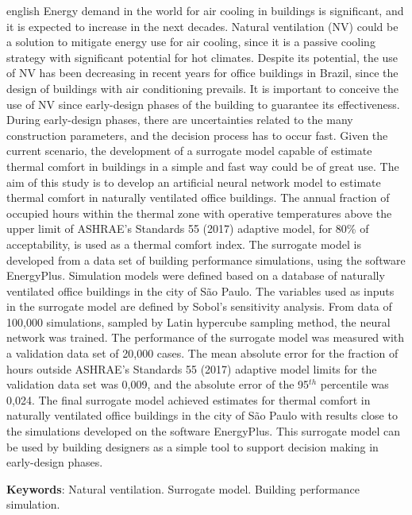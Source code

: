 \begin{resumo}[Abstract]
	\SingleSpacing
	\begin{otherlanguage*}{english}
		Energy demand in the world for air cooling in buildings is significant, and it is expected to increase in the next decades.
		Natural ventilation (NV) could be a solution to mitigate energy use for air cooling, since it is a passive cooling strategy with significant potential for hot climates.
		Despite its potential, the use of NV has been decreasing in recent years for office buildings in Brazil, since the design of buildings with air conditioning prevails.		
		It is important to conceive the use of NV since early-design phases of the building to guarantee its effectiveness.
		During early-design phases, there are uncertainties related to the many construction parameters, and the decision process has to occur fast.
		Given the current scenario, the development of a surrogate model capable of estimate thermal comfort in buildings in a simple and fast way could be of great use.		
		The aim of this study is to develop an artificial neural network model to estimate thermal comfort in naturally ventilated office buildings.
		The annual fraction of occupied hours within the thermal zone with operative temperatures above the upper limit of ASHRAE's Standards 55 (2017) adaptive model, for 80\% of acceptability, is used as a thermal comfort index.		
		The surrogate model is developed from a data set of building performance simulations, using the software EnergyPlus.
		Simulation models were defined based on a database of naturally ventilated office buildings in the city of São Paulo.
		The variables used as inputs in the surrogate model are defined by Sobol's sensitivity analysis.		
		From data of 100,000 simulations, sampled by Latin hypercube sampling method, the neural network was trained.
		The performance of the surrogate model was measured with a validation data set of 20,000 cases.
		The mean absolute error for the fraction of hours outside ASHRAE's Standards 55 (2017) adaptive model limits for the validation data set was 0,009, and the absolute error of the 95$^{th}$ percentile was 0,024.		
		The final surrogate model achieved estimates for thermal comfort in naturally ventilated office buildings in the city of São Paulo with results close to the simulations developed on the software EnergyPlus. This surrogate model can be used by building designers as a simple tool to support decision making in early-design phases.
		
		\textbf{Keywords}: Natural ventilation. Surrogate model. Building performance simulation.
	\end{otherlanguage*}
\end{resumo}

